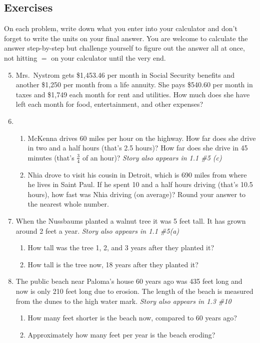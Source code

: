 \subsection*{Exercises}

On each problem, write down what you enter into your calculator and don't forget to write the units on your final answer.  You are welcome to calculate the answer step-by-step but challenge yourself to figure out the answer all at once, not hitting $=$ on your calculator until the very end.

\begin{enumerate} 
\setcounter{enumi}{4}

\item Mrs.\ Nystrom gets \$1,453.46 per month in Social Security benefits and another \$1,250 per month from a life annuity. She pays \$540.60 per month in taxes and \$1,749 each month for rent and utilities.  How much does she have left each month for food, entertainment, and other expenses?

\item \begin{enumerate}
\item McKenna drives 60 miles per hour on the highway.  How far does she drive in two and a half hours (that's 2.5 hours)? How far does she drive in 45 minutes (that's $\frac{3}{4}$ of an hour)? \hfill \emph{Story also appears in 1.1 \#5 (c)}
\item Nhia drove to visit his cousin in Detroit, which is 690 miles from where he lives in Saint Paul.  If he spent 10 and a half hours driving (that's 10.5 hours), how fast was Nhia driving (on average)?  Round your answer to the nearest whole number. 
\end{enumerate}

\item When the Nussbaums planted a walnut tree it was 5 feet tall.  It has grown around 2 feet a year.  \hfill \emph{Story also appears in 1.1 \#5(a)}
\begin{enumerate}
\item How tall was the tree 1, 2, and 3 years after they planted it?
\item  How tall is the tree now, 18 years after they planted it?
\end{enumerate}

\item The public beach near Paloma's house 60 years ago was 435 feet long and now is only 210 feet long due to erosion. The length of the beach is measured from the dunes to the high water mark. \hfill \emph{Story also appears in 1.3 \#10}
\begin{enumerate}
\item How many feet shorter is the beach now, compared to 60 years ago?
\item Approximately how many feet per year is the beach eroding?
\end{enumerate}


\end{enumerate}
